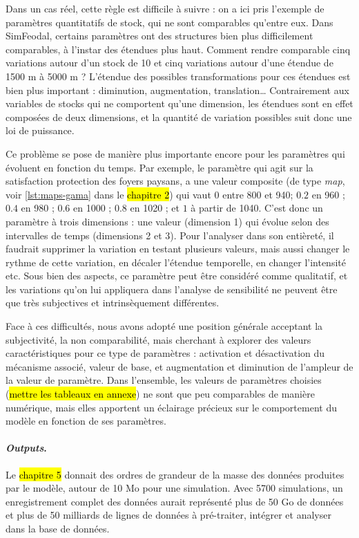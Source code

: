 Dans un cas réel, cette règle est difficile à suivre : on a ici pris l'exemple de paramètres quantitatifs \og de stock\fg{}, qui ne sont comparables qu'entre eux.
Dans SimFeodal, certains paramètres ont des structures bien plus difficilement comparables, à l'instar des étendues plus haut.
Comment rendre comparable cinq variations autour d'un stock de 10 et cinq variations autour d'une étendue  de 1500 m à 5000 m ?
L'étendue des possibles transformations pour ces étendues est bien plus important : diminution, augmentation, translation\ldots{}
Contrairement aux variables de stocks qui ne comportent qu'une dimension, les étendues sont en effet composées de deux dimensions, et la quantité de variation possibles suit donc une loi de puissance.

Ce problème se pose de manière plus importante encore pour les paramètres qui évoluent en fonction du temps.
Par exemple, le paramètre qui agit sur la satisfaction protection des foyers paysans, a une valeur composite (de type \textit{map}, voir \cref{lst:maps-gama} dans le \hl{chapitre 2}) qui vaut \og $0$ entre 800 et 940; $0.2$ en 960 ; $0.4$ en 980 ; $0.6$ en 1000 ; $0.8$ en 1020 ; et $1$ à partir de 1040\fg{}.
C'est donc un paramètre à trois dimensions : une valeur (dimension 1) qui évolue selon des intervalles de temps (dimensions 2 et 3).
Pour l'analyser dans son entièreté, il faudrait supprimer la variation en testant plusieurs valeurs, mais aussi changer le rythme de cette variation, en décaler l'étendue temporelle, en changer l'intensité etc.
Sous bien des aspects, ce paramètre peut être considéré comme qualitatif, et les variations qu'on lui appliquera dans l'analyse de sensibilité ne peuvent être que très subjectives et intrinsèquement différentes.

Face à ces difficultés, nous avons adopté une position générale acceptant la subjectivité, la non comparabilité, mais cherchant à explorer des valeurs \og caractéristiques\fg{} pour ce type de paramètres : activation et désactivation du mécanisme associé, valeur de base, et augmentation et diminution de l'ampleur de la valeur de paramètre.
Dans l'ensemble, les valeurs de paramètres choisies (\hl{mettre les tableaux en annexe}) ne sont que peu comparables de manière numérique, mais elles apportent un éclairage précieux sur le comportement du modèle en fonction de ses paramètres.

\paragraph{\textit{Outputs}.}
Le \hl{chapitre 5} donnait des ordres de grandeur de la masse des données produites par le modèle, autour de 10 Mo pour une simulation.
Avec 5700 simulations, un enregistrement complet des données aurait représenté plus de 50 Go de données et plus de 50 milliards de lignes de données à pré-traiter, intégrer et analyser dans la base de données.

